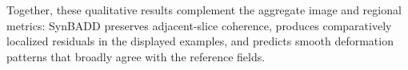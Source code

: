 Together, these qualitative results complement the aggregate image and regional metrics: SynBADD preserves adjacent-slice coherence, produces comparatively localized residuals in the displayed examples, and predicts smooth deformation patterns that broadly agree with the reference fields.


















